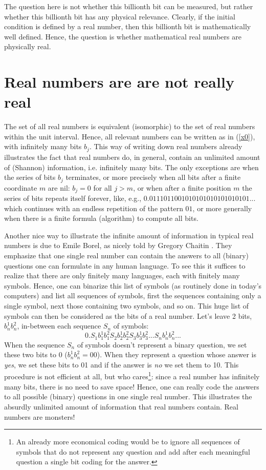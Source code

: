 \documentclass[floatfix,12pt]{article}
\newcommand{\beq}{\begin{equation}}
\newcommand{\eeq}{\end{equation}}
\begin{document}
The question here is not whether this billionth bit can be measured, but rather whether this billionth bit has any physical relevance. Clearly, if the initial condition is defined by a real number, then this billionth bit is mathematically well defined. Hence, the question is whether mathematical real numbers are physically real.


\section{Real numbers are are not really real}\label{realNb}
The set of all real numbers is equivalent (isomorphic) to the set of real numbers within the unit interval. Hence, all relevant numbers can be written as in (\ref{x0}), with infinitely many bits $b_j$. This way of writing down real numbers already illustrates the fact that real numbers do, in general, contain an unlimited amount of (Shannon) information, i.e. infinitely many bits. The only exceptions are when the series of bits $b_j$ terminates, or more precisely when all bits after a finite coordinate $m$ are nil: $b_j=0$ for all $j>m$, or when after a finite position $m$ the series of bits repeats itself forever, like, e.g., $0.0111011001010101010101010101...$ which continues with an endless repetition of the pattern $01$, or more generally when there is a finite formula (algorithm) to compute all bits.

Another nice way to illustrate the infinite amount of information in typical real numbers is due to Emile Borel, as nicely told by Gregory Chaitin \cite{Chaitin}. They emphasize that one single real number can contain the answers to all (binary) questions one can formulate in any human language. To see this it suffices to realize that there are only finitely many languages, each with finitely many symbols. Hence,  one can binarize this list of symbols (as routinely done in today's computers) and list all sequences of symbols, first the sequences containing only a single symbol, next those containing two symbols, and so on. This huge list of symbols can then be considered as the bits of a real number. Let's leave 2 bits, $b_n^1b_n^2$, in-between each sequence $S_n$ of symbols:
\beq
0.S_1b_1^1b_1^2S_2b_2^1b_2^2S_3b_3^1b_3^2...S_nb_n^1b_n^2...
\eeq
When the sequence $S_n$ of symbols doesn't represent a binary question, we set these two bits to 0 ($b_n^1b_n^2=00$). When they represent a question whose answer is {\it yes}, we set these bits to 01 and if the answer is {\it no} we set them to 10. This procedure is not efficient at all, but who cares\footnote{An already more economical coding would be to ignore all sequences of symbols that do not represent any question and add after each meaningful question a single bit coding for the answer.}: since a real number has infinitely many bits, there is no need to save space! Hence, one can really code the answers to all possible (binary) questions in one single real number. This illustrates the absurdly unlimited amount of information that real numbers contain. Real numbers are monsters!
\end{document}
